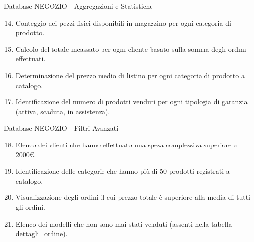 \documentclass{beamer}
\begin{document}
\begin{frame}{Database NEGOZIO - Aggregazioni e Statistiche}

    \vfill
    \begin{enumerate}
        \setcounter{enumi}{13}
        \item Conteggio dei pezzi fisici disponibili in magazzino per ogni categoria di prodotto.
        \item Calcolo del totale incassato per ogni cliente basato sulla somma degli ordini effettuati.
        \item Determinazione del prezzo medio di listino per ogni categoria di prodotto a catalogo.
        \item Identificazione del numero di prodotti venduti per ogni tipologia di garanzia (attiva, scaduta, in assistenza).
    \end{enumerate}
    \vfill
\end{frame}

\begin{frame}{Database NEGOZIO - Filtri Avanzati}

    \vfill
    \begin{enumerate}
        \setcounter{enumi}{17}
        \item Elenco dei clienti che hanno effettuato una spesa complessiva superiore a 2000€.
        \item Identificazione delle categorie che hanno più di 50 prodotti registrati a catalogo.
        \item Visualizzazione degli ordini il cui prezzo totale è superiore alla media di tutti gli ordini.
        \item Elenco dei modelli che non sono mai stati venduti (assenti nella tabella dettagli\_ordine).
    \end{enumerate}
    \vfill
\end{frame}
\end{document}
